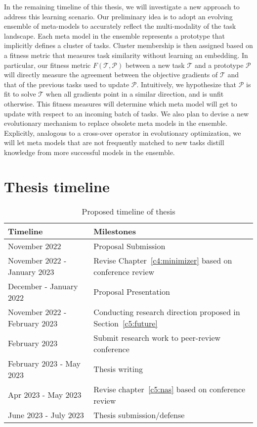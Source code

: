 In the remaining timeline of this thesis, we will investigate a new approach to address this learning scenario. Our preliminary idea is to adopt an evolving ensemble of meta-models to accurately reflect the multi-modality of the task landscape. Each meta model in the ensemble represents a prototype that implicitly defines a cluster of tasks. Cluster membership is then assigned based on a fitness metric that measures task similarity without learning an embedding. In particular, our fitness metric $F(\mathcal{T}, \mathcal{P})$ between a new task $\mathcal{T}$ and a prototype $\mathcal{P}$ will directly measure the agreement between the objective gradients of $\mathcal{T}$ and that of the previous tasks used to update $\mathcal{P}$. Intuitively, we hypothesize that $\mathcal{P}$ is fit to solve $\mathcal{T}$ when all gradients point in a similar direction, and is unfit otherwise. This fitness measures will determine which meta model will get to update with respect to an incoming batch of tasks. We also plan to devise a new evolutionary mechanism to replace obsolete meta models in the ensemble. Explicitly, analogous to a cross-over operator in evolutionary optimization, we will let meta models that are not frequently matched to new tasks distill knowledge from more successful models in the ensemble.

\section{Thesis timeline}
\begin{table}[ht]
\centering
\begin{tabular}{l|l}
\textbf{Timeline}                     & \textbf{Milestones}                                      \\
\hline
November 2022               & Proposal Submission                            \\
November 2022 - January 2023          & Revise Chapter~\ref{c4:minimizer} based on conference review    \\
December - January 2022       & Proposal Presentation                          \\
November 2022 - February 2023  & Conducting research direction proposed in Section~\ref{c5:future}                \\
February 2023 & Submit research work to peer-review conference \\
February 2023 - May 2023     & Thesis writing                                 \\
Apr 2023 - May 2023          & Revise chapter~\ref{c5:nas} based on conference review    \\
June 2023 - July 2023         & Thesis submission/defense   \\
\hline
\end{tabular}
\caption{Proposed timeline of thesis}
\end{table}